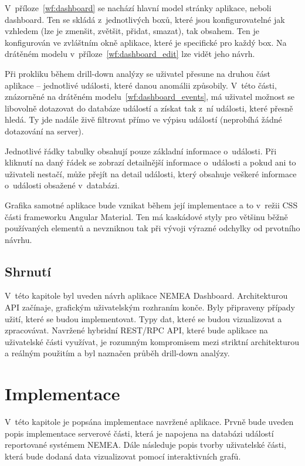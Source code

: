 V~příloze~\ref{wf:dashboard} se nachází hlavní model stránky aplikace, neboli dashboard. Ten se skládá z~jednotlivých boxů, které jsou konfigurovatelné jak vzhledem (lze je zmenšit, zvětšit, přidat, smazat), tak obsahem. Ten je konfigurován ve zvláštním okně aplikace, které je specifické pro každý box. Na drátěném modelu v~příloze~\ref{wf:dashboard_edit} lze vidět jeho návrh.

Při prokliku během drill-down analýzy se uživatel přesune na druhou část aplikace -- jednotlivé události, které danou anomálii způsobily. V~této části, znázorněné na drátěném modelu~\ref{wf:dashboard_events}, má uživatel možnost se libovolně dotazovat do databáze událostí a získat tak z~ní události, které přesně hledá. Ty jde nadále živě filtrovat přímo ve výpisu událostí (neprobíhá žádné dotazování na server).

Jednotlivé řádky tabulky obsahují pouze základní informace o~události. Při kliknutí na daný řádek se zobrazí detailnější informace o~události a pokud ani to uživateli nestačí, může přejít na detail události, který obsahuje veškeré informace o~události obsažené v~databázi.

Grafika samotné aplikace bude vznikat během její implementace a to v~režii CSS části frameworku Angular Material. Ten má kaskádové styly pro většinu běžně používaných elementů a nevzniknou tak při vývoji výrazné odchylky od prvotního návrhu.

\section{Shrnutí}

V~této kapitole byl uveden návrh aplikace NEMEA Dashboard. Architekturou API začínaje, grafickým uživatelským rozhraním konče. Byly připraveny případy užití, které se budou implementovat. Typy dat, které se budou vizualizovat a zpracovávat. Navržené hybridní REST/RPC API, které bude aplikace na uživatelské části využívat, je rozumným kompromisem mezi striktní architekturou a reálným použitím a byl naznačen průběh drill-down analýzy.

\chapter{Implementace}
\label{implementace}

V~této kapitole je popsána implementace navržené aplikace. Prvně bude uveden popis implementace serverové části, která je napojena na databázi událostí reportované systémem NEMEA. Dále následuje popis tvorby uživatelské části, která bude dodaná data vizualizovat pomocí interaktivních grafů.


